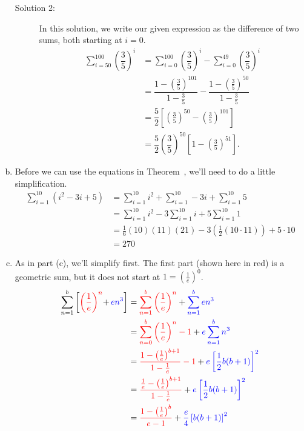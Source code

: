 \begin{solution}
\begin{enumerate}[(a)]
\begin{description}
\item[Solution 2:]
In this solution, we write our given expression as the difference of two sums, both starting at $i=0$.
\begin{align*}
\displaystyle\sum_{i=50}^{100} \left(\dfrac{3}{5}\right)^i&=
\displaystyle\sum_{i=0}^{100} \left(\dfrac{3}{5}\right)^i-
\displaystyle\sum_{i=0}^{49} \left(\dfrac{3}{5}\right)^i\\
&=\dfrac{1-\left(\frac{3}{5}\right)^{101}}{1-\frac{3}{5}} -
\dfrac{1-\left(\frac{3}{5}\right)^{50}}{1-\frac{3}{5}} \\
&=\dfrac{5}{2}\left[\left(\frac{3}{5}\right)^{50}-\left(\frac{3}{5}\right)^{101}\right]\\
&=\dfrac{5}{2}\left(\dfrac{3}{5}\right)^{50}\left[1-\left(\frac{3}{5}\right)^{51}\right].
\end{align*}
\end{description}
\item Before we can use the equations in Theorem~, we'll need to do a little simplification.
\begin{align*}
\displaystyle\sum_{i=1}^{10} \left(i^2-3i+5\right)&=
\displaystyle\sum_{i=1}^{10} i^2
+\displaystyle\sum_{i=1}^{10} -3i
+\displaystyle\sum_{i=1}^{10}5\\
&=
\displaystyle\sum_{i=1}^{10} i^2
-3\displaystyle\sum_{i=1}^{10} i
+5\displaystyle\sum_{i=1}^{10}1\\
&=
\frac{1}{6}(10)(11)(21)
-3\left(\frac{1}{2}(10\cdot 11)\right)
+5\cdot 10\\
&=270
\end{align*}
\item As in part (c), we'll simplify first. The first part (shown here in red) is a geometric sum, but it does not start at $1=\left(\frac{1}{e}\right)^0$.
\begin{align*}
\displaystyle\sum_{n=1}^{b}\left[\textcolor{red}{ \left(\frac{1}{e}\right)^n}\textcolor{black}+
\,\textcolor{blue}{en^3}\right]&=
\color{red}\displaystyle\sum_{n=1}^{b} \left(\frac{1}{e}\right)^n\color{black}+\color{blue}
\displaystyle\sum_{n=1}^{b}en^3\\
&=\color{red}
\displaystyle\sum_{n=0}^{b} \left(\frac{1}{e}\right)^{n}-1
\color{black}+
\color{blue}e\displaystyle\sum_{n=1}^{b}n^3\\
&=\color{red}
\dfrac{1-\left(\frac{1}{e}\right)^{b+1}}{1-\frac{1}{e}}-1
\color{black}+
\color{blue}e\left[\frac{1}{2}b(b+1)\right]^2\\
              &=\color{red}
              \dfrac{\frac{1}{e}-\left(\frac{1}{e}\right)^{b+1}}{1-\frac{1}{e}}
              \color{black}+
              \color{blue}e\left[\frac{1}{2}b(b+1)\right]^2\\
&=\textcolor{red}{\dfrac{1-\left(\frac{1}{e}\right)^b}{e-1}}+\textcolor{blue}{\frac{e}{4}\left[b(b+1)\right]^2}
\end{align*}
\end{enumerate}
\end{solution}


